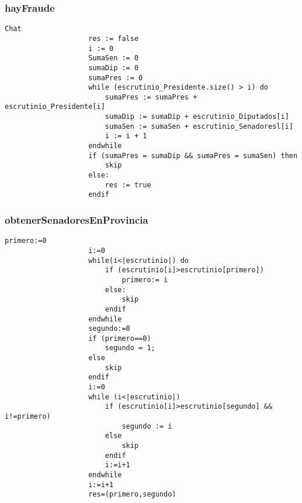 \documentclass[10pt,a4paper]{article}
\begin{document}
		\subsubsection{hayFraude}
			\begin{minipage}[t]{\textwidth}
				\begin{lstlisting}[label=code:for]Chat
                    res := false
					i := 0
					SumaSen := 0
					sumaDip := 0
					sumaPres := 0
					while (escrutinio_Presidente.size() > i) do
						sumaPres := sumaPres + escrutinio_Presidente[i]
						sumaDip := sumaDip + escrutinio_Diputados[i]
						sumaSen := sumaSen + escrutinio_Senadoresl[i]
						i := i + 1
					endwhile
					if (sumaPres = sumaDip && sumaPres = sumaSen) then 
						skip
					else:
						res := true
					endif
				\end{lstlisting}
			\end{minipage}

		\subsubsection{obtenerSenadoresEnProvincia}
			\begin{minipage}[t]{\textwidth}
				\begin{lstlisting}[label=code:for]
		            primero:=0
                    i:=0     
                    while(i<|escrutinio|) do 
                        if (escrutinio[i]>escrutinio[primero]) 
                            primero:= i 
                        else:
                            skip
                        endif
                    endwhile
                    segundo:=0
                    if (primero==0)
                        segundo = 1;
                    else
                        skip
                    endif
                    i:=0
                    while (i<|escrutinio|)
                        if (escrutinio[i]>escrutinio[segundo] && i!=primero)
                            segundo := i
                        else
                            skip
                        endif
                        i:=i+1                     
                    endwhile
                    i:=i+1 
                    res=(primero,segundo) 
				\end{lstlisting}
			\end{minipage}
	
\end{document}
